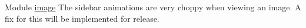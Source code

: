 
\begin{DoxyRefList}
\item[Module \mbox{\hyperlink{group__image}{image}} ]\label{bug__bug000001}%
%
The sidebar animations are very choppy when viewing an image. A fix for this will be implemented for release.
\end{DoxyRefList}